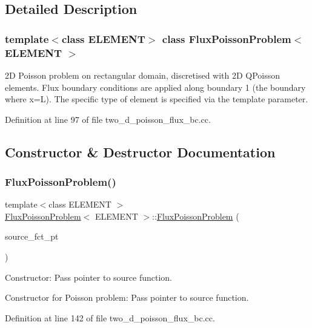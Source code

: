 \subsection{Detailed Description}
\subsubsection*{template$<$class E\+L\+E\+M\+E\+NT$>$\newline
class Flux\+Poisson\+Problem$<$ E\+L\+E\+M\+E\+N\+T $>$}

2D Poisson problem on rectangular domain, discretised with 2D Q\+Poisson elements. Flux boundary conditions are applied along boundary 1 (the boundary where x=L). The specific type of element is specified via the template parameter. 

Definition at line 97 of file two\+\_\+d\+\_\+poisson\+\_\+flux\+\_\+bc.\+cc.



\subsection{Constructor \& Destructor Documentation}
\mbox{\label{classFluxPoissonProblem_a1b57e0c67634586cb69fbeeec7874e36}} 
\subsubsection{\texorpdfstring{Flux\+Poisson\+Problem()}{FluxPoissonProblem()}}
{\footnotesize\ttfamily template$<$class E\+L\+E\+M\+E\+NT $>$ \\
\hyperlink{classFluxPoissonProblem}{Flux\+Poisson\+Problem}$<$ E\+L\+E\+M\+E\+NT $>$\+::\hyperlink{classFluxPoissonProblem}{Flux\+Poisson\+Problem} (\begin{DoxyParamCaption}\item[{Poisson\+Equations$<$ 2 $>$\+::Poisson\+Source\+Fct\+Pt}]{source\+\_\+fct\+\_\+pt }\end{DoxyParamCaption})}



Constructor\+: Pass pointer to source function. 

Constructor for Poisson problem\+: Pass pointer to source function. 

Definition at line 142 of file two\+\_\+d\+\_\+poisson\+\_\+flux\+\_\+bc.\+cc.



